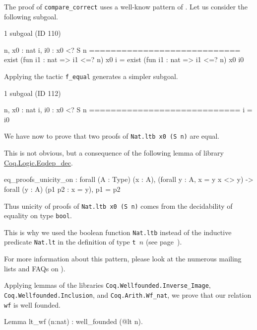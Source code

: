 \begin{remark}
 The proof of \texttt{compare\_correct} uses a well-know pattern of \coq{}.
Let us consider  the following subgoal.

\begin{Coqanswer}
 1 subgoal (ID 110)
  
  n, x0 : nat
  i, i0 : x0 <? S n
  ============================
  exist (fun i1 : nat => i1 <=? n) x0 i =
  exist (fun i1 : nat => i1 <=? n) x0 i0
\end{Coqanswer}

Applying the tactic \texttt{f\_equal} generates a simpler subgoal.

\begin{Coqanswer}
1 subgoal (ID 112)
  
  n, x0 : nat
  i, i0 : x0 <? S n
  ============================
  i = i0
\end{Coqanswer}

We have now to prove that two proofs of \texttt{Nat.ltb x0 (S n)} are equal.

This is not obvious, but  a consequence of the following lemma of library 
\href{https://coq.inria.fr/distrib/current/stdlib/Coq.Logic.Eqdep_dec.html}{Coq.Logic.Eqdep\_dec}.


\begin{Coqanswer}
eq_proofs_unicity_on :
forall (A : Type) (x : A),
(forall y : A, x = y \/ x <> y) -> forall (y : A) (p1 p2 : x = y), p1 = p2
\end{Coqanswer}

Thus unicity of proofs of \texttt{Nat.ltb x0 (S n)}  comes from the decidability of
equality on type \texttt{bool}.

This is why we used the boolean function \texttt{Nat.ltb} instead of the inductive predicate \texttt{Nat.lt} in the definition of type \texttt{t $n$} (see page~\pageref{def: Finite-ord-type}).

For more information about this pattern, please look at the numerous mailing lists and 
FAQs on \coq{}).



\end{remark}


Applying lemmas of the libraries \texttt{Coq.Wellfounded.Inverse\_Image},
 \texttt{Coq.Wellfounded.Inclusion}, and \texttt{Coq.Arith.Wf\_nat}, we prove that our
relation \texttt{wf} is well founded.

\begin{Coqsrc}
Lemma lt_wf (n:nat) : well_founded (@lt n).
\end{Coqsrc}

